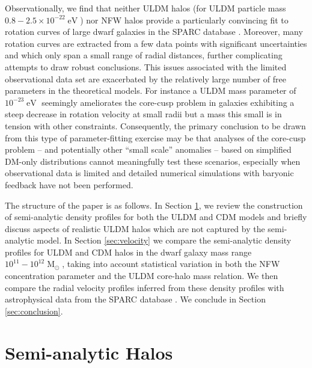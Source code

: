 \documentclass{pasa}%
\begin{document}
Observationally, we find that neither ULDM halos (for ULDM particle mass $0.8-2.5\times 10^{-22} \operatorname{eV}$) nor NFW halos provide a particularly convincing fit to rotation curves of large dwarf galaxies in the SPARC database \cite{Lelli:2016zqa}.  Moreover, many rotation curves are extracted from a few data points with significant uncertainties and which only span a small range of radial distances, further complicating attempts to draw robust conclusions. This issues associated with the limited observational data set are exacerbated by the relatively large number of free parameters in the theoretical models. For instance a ULDM mass parameter of $10^{-23}\operatorname{eV}$ seemingly ameliorates the core-cusp problem in galaxies exhibiting a steep decrease in rotation velocity at small radii but a mass this small is in tension with other constraints. Consequently, the primary conclusion to be drawn from this type of parameter-fitting exercise may be that  analyses of the core-cusp problem -- and potentially other ``small scale'' anomalies -- based on simplified DM-only distributions cannot meaningfully test these scenarios, especially when observational data is limited and detailed numerical simulations with baryonic feedback have not been performed. 

The structure of the paper is as follows. In Section \ref{sec:models}, we review the construction of semi-analytic density profiles for both the ULDM and CDM models and briefly discuss aspects of realistic ULDM halos which are not captured by the semi-analytic model. In Section \ref{sec:velocity} we compare the semi-analytic density profiles for ULDM and CDM halos in the dwarf galaxy mass range $10^{11} - 10^{12}\operatorname{M}_{\odot}$, taking into account statistical variation in both the NFW concentration parameter and the ULDM core-halo mass relation. We then compare the radial velocity profiles inferred from these density profiles with astrophysical data from the SPARC database \cite{Lelli:2016zqa}. We conclude in Section \ref{sec:conclusion}.


 
\section{Semi-analytic Halos}\label{sec:models}



\end{document}
